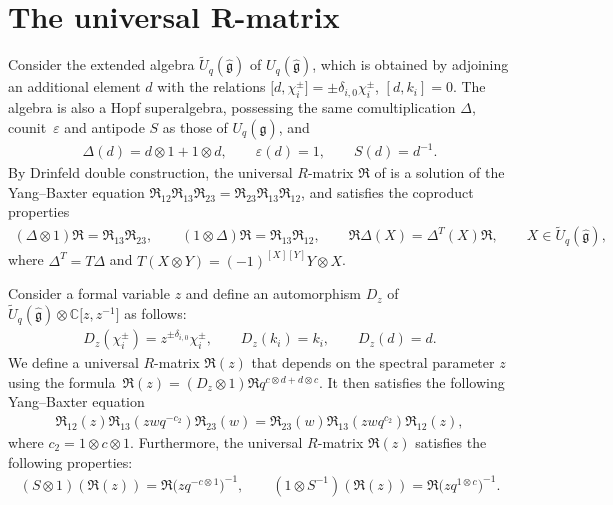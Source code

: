 \documentclass[pdftex]{sigma}
\numberwithin{equation}{section}
\begin{document}
\section[The universal R-matrix]{The universal $\boldsymbol{R}$-matrix}\label{sec3}

Consider the extended algebra $\widetilde{U}_q(\mathfrak{\hat{g}})$ of $U_q(\mathfrak{\hat{g}})$, which is obtained by adjoining an additional element $d$ with the relations
$ \bigl[d, \chi_i^{\pm}\bigr]=\pm \delta_{i,0}\chi_i^{\pm}$, $ [d, k_i]=0$.
The algebra  is also a Hopf superalgebra, possessing the same comultiplication
$\Delta$, counit~$\varepsilon$ and antipode $S$ as those of $U_q(\mathfrak{\hat{g}})$, and
\begin{gather*}
 \Delta(d)=d\otimes1+1\otimes d,\qquad \varepsilon(d)=1,\qquad S(d)=d^{-1}.
\end{gather*}
By Drinfeld double construction, the universal $R$-matrix $\mathfrak{R}$ of  is a solution of the Yang--Baxter equation
$\mathfrak{R}_{12}\mathfrak{R}_{13}\mathfrak{R}_{23}=\mathfrak{R}_{23}\mathfrak{R}_{13}\mathfrak{R}_{12}$,
and satisfies the coproduct properties
\begin{gather*}
 (\Delta\otimes 1)\mathfrak{R}=\mathfrak{R}_{13}\mathfrak{R}_{23},\qquad (1\otimes \Delta)\mathfrak{R}=\mathfrak{R}_{13}\mathfrak{R}_{12}, \qquad
 \mathfrak{R}\Delta(X)=\Delta^T(X)\mathfrak{R}, \qquad X\in\widetilde{U}_q(\mathfrak{\hat{g}}),
\end{gather*}
where $\Delta^T=T\Delta$ and $T(X\otimes Y)=(-1)^{[X][Y]}Y\otimes X$.


Consider a formal variable $z$ and define an automorphism $D_z$ of $\widetilde{U}_q(\mathfrak{\hat{g}})\otimes\mathbb{C}\bigl[z, z^{-1}\bigr]$ as follows:
\begin{gather}\label{Dz}
 D_z(\chi_i^{\pm})=z^{\pm\delta_{i,0}}\chi_i^{\pm}, \qquad D_z(k_i)=k_i, \qquad D_z(d)=d.
\end{gather}
We define a universal $R$-matrix $\mathfrak{R}(z)$ that depends on the spectral parameter $z$ using the formula~${
\mathfrak{R}(z)=(D_z\otimes1)\mathfrak{R}q^{c\otimes d+d\otimes c}}$.
It then satisfies the following Yang--Baxter equation
\begin{gather}\label{oper0}
 \mathfrak{R}_{12}(z)\mathfrak{R}_{13}(zwq^{-c_2})\mathfrak{R}_{23}(w)=\mathfrak{R}_{23}(w)\mathfrak{R}_{13}(zwq^{c_2})\mathfrak{R}_{12}(z),
\end{gather}where $c_2=1\otimes c\otimes1$.
Furthermore, the universal $R$-matrix $\mathfrak{R}(z)$ satisfies the following properties:
\begin{gather*}%
 (S\otimes1)(\mathfrak{R}(z))=\mathfrak{R}\bigl(zq^{-c\otimes1}\bigr)^{-1},\qquad (1\otimes S^{-1})(\mathfrak{R}(z))=\mathfrak{R}\bigl(zq^{1\otimes c}\bigr)^{-1}.
\end{gather*}
\end{document}
